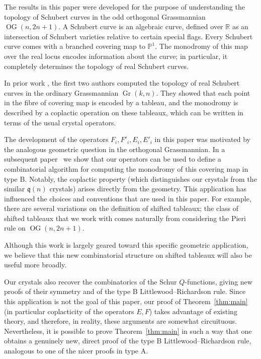 \documentclass[ALCO,ThmDefs,Unicode,epreuves]{cedram}
\newcommand{\RR}{\mathbb{R}}
\newcommand{\PP}{\mathbb{P}}
\DeclareMathOperator{\OG}{OG}
\DeclareMathOperator{\Gr}{Gr}
\begin{document}
The results in this paper were developed for the purpose of understanding
the topology of Schubert curves in the odd orthogonal Grassmannian
$\OG(n,2n+1)$. A Schubert curve is an algebraic curve, defined over
$\RR$ as an intersection of Schubert varieties relative to certain special
flags. Every Schubert curve comes with a branched covering map to $\PP^1$.
The monodromy of this map over the real locus encodes information about
the curve; in particular, it completely determines the topology of real
Schubert curves.

In prior work \cite{GillespieLevinson}, the first two authors computed the topology of real Schubert curves in the ordinary Grassmannian $\Gr(k,n)$. They showed that each point in the fibre of covering map is encoded by a tableau, and the monodromy is described by a coplactic operation on these tableaux, which can be written in terms of the usual crystal operators.


The development of the operators $F_i,F'_i,E_i,E'_i$ in this paper was motivated by the analogous geometric question in the orthogonal Grassmannian. In a subsequent paper~\cite{GLP} we show that our operators can be used to define a combinatorial algorithm for computing the monodromy of this covering map in type B. Notably, the coplactic property (which distinguishes our crystals from the similar $\mathfrak{q}(n)$ crystals) arises directly from the geometry. This application has influenced the choices and conventions that are used in this paper. For example, there are several variations on the definition of shifted tableaux; the class of shifted tableaux that we work with comes naturally from considering the Pieri rule on $\OG (n,2n+1)$.

Although this work is largely geared toward this specific geometric application, we believe that this new combinatorial structure on shifted tableaux will also be useful more broadly.


Our crystals also recover the combinatorics of the Schur $Q$-functions, giving new proofs of their symmetry and of the type B Littlewood--Richardson rule. Since this application is not the goal of this paper, our proof of Theorem~\ref{thm:main} (in particular coplacticity of the operators $E,F$) takes advantage of existing theory, and therefore, in reality, these arguments are somewhat circuituous. Nevertheless, it is possible to prove Theorem~\ref{thm:main} in such a way that one obtains a genuinely new, direct proof of the type B Littlewood--Richardson rule, analogous to one of the nicer proofs in type A. 
\end{document}
